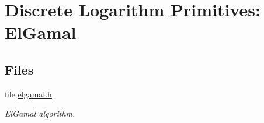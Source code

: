 \hypertarget{group__DL__elgamal__m}{
\section{Discrete Logarithm Primitives: El\-Gamal}
\label{group__DL__elgamal__m}
}
\subsection*{Files}
\begin{CompactItemize}
\item 
file \hyperlink{elgamal_8h}{elgamal.h}
\begin{CompactList}\small\item\em El\-Gamal algorithm. \item\end{CompactList}

\end{CompactItemize}
